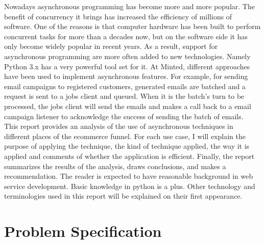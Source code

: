 \documentclass[12pt]{article}
\begin{document}
Nowadays asynchronous programming has become more and more popular. The benefit of concurrency it brings has increased the efficiency of millions of software. One of the reasons is that computer hardware has been built to perform concurrent tasks for more than a decades now, but on the software side it has only become widely popular in recent years. As a result, support for asynchronous programming are more often added to new technologies. Namely Python 3.x has a very powerful tool set for it. At Minted, different approaches have been used to implement asynchronous features. For example, for sending email campaigns to registered customers, generated emails are batched and a request is sent to a jobs client and queued. When it is the batch's turn to be processed, the jobs client will send the emails and makes a call back to a email campaign listener to acknowledge the success of sending the batch of emails.\\


This report provides an analysis of the use of asynchronous techniques in different places of the ecommerce funnel. For each use case, I will explain the purpose of applying the technique, the kind of technique applied, the way it is applied and comments of whether the application is efficient. Finally, the report summarizes the results of the analysis, draws conclusions, and makes a recommendation. The reader is expected to have reasonable background in web service development. Basic knowledge in python is a plus. Other technology and terminologies used in this report will be explained on their first appearance.\\



\newpage

\section{Problem Specification}
\end{document}
